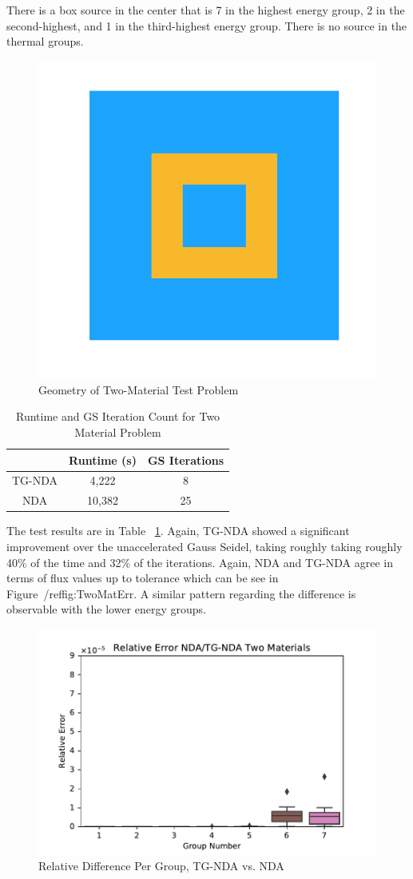 There is a box source in the center that is 7 in the highest energy group, 2 in the second-highest, and 1 in the third-highest energy group. There is no source in the thermal groups.
\begin{figure}[H]
    \centering
    \includegraphics[width=.3\textwidth]{fig/Geometry.png}
    \caption{Geometry of Two-Material Test Problem}
    \label{fig:test_geometry}
\end{figure}

\begin{table}[!htb]
\centering
\caption{Runtime and GS Iteration Count for Two Material Problem}
    \label{tab:two}
\begin{center}
    \begin{tabular}{|c|c|c|}
    \hline
    & Runtime (s) & GS Iterations \\
    \hline
    TG-NDA & 4,222 & 8 \\
    NDA & 10,382 & 25 \\
    \hline
    \end{tabular}
\end{center}
\end{table}

The test results are in Table ~\ref{tab:two}. Again, TG-NDA showed a significant improvement over the unaccelerated Gauss Seidel, taking roughly taking roughly 40\% of the time and 32\% of the iterations. Again, NDA and TG-NDA agree in terms of flux values up to tolerance which can be see in Figure~/ref{fig:TwoMatErr}. A similar pattern regarding the difference is observable with the lower energy groups.

\begin{figure}[H]
    \centering
    \includegraphics[width=.75\textwidth]{fig/TwoMatErr.pdf}
    \caption{Relative Difference Per Group, TG-NDA vs. NDA}
    \label{fig:TwoMatErr}
\end{figure}


